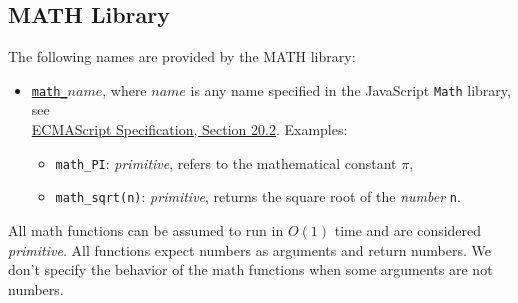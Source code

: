 \subsection*{MATH Library}


The following names are provided by the MATH library:
\begin{itemize}
\item \href{https://sourceacademy.org/sicpjs/1.1.4\#p8}{\lstinline{math_}$\textit{name}$},
where $\textit{name}$ is any name specified in the
JavaScript
\texttt{Math} library, see\\
\href{https://www.ecma-international.org/ecma-262/9.0/index.html\#sec-math-object}{\color{DarkBlue}ECMAScript Specification, Section 20.2}. Examples:
\begin{itemize}
\item \verb#math_PI#: \textit{primitive}, refers to the mathematical constant $\pi$,
\item \verb#math_sqrt#\texttt{(n)}: \textit{primitive}, returns the square root of the \emph{number} \texttt{n}.
\end{itemize}
\end{itemize}
All math functions can be assumed to run in $O(1)$ time and are considered
\textit{primitive}. All functions expect numbers as arguments and return numbers.
We don't specify the behavior of the math functions when some arguments are
not numbers.
